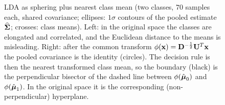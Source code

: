 \begin{figure}[htbp]
    \caption{LDA as sphering plus nearest class mean (two classes, $70$ samples each, shared covariance; ellipses: $1\sigma$ contours of the pooled estimate $\widehat{\mathbf{\Sigma}}$; crosses: class means). Left: in the original space the classes are elongated and correlated, and the Euclidean distance to the means is misleading. Right: after the common transform $\phi(\bm{\mathrm{x}})=\mathbf{D}^{-\frac12}\mathbf{U}^T\bm{\mathrm{x}}$ the pooled covariance is the identity (circles). The decision rule is then the nearest transformed class mean, so the boundary (black) is the perpendicular bisector of the dashed line between $\phi(\hat{\bm{\mathrm{\mu}}}_0)$ and $\phi(\hat{\bm{\mathrm{\mu}}}_1)$. In the original space it is the corresponding (non-perpendicular) hyperplane.}
    \label{fig:lda_sphering}
  \end{figure}
   
